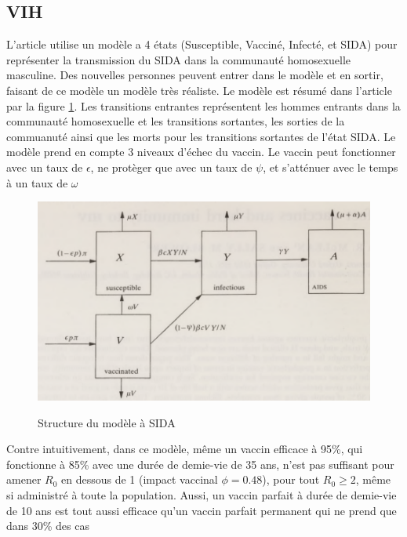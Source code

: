 \documentclass[journal, a4paper]{IEEEtran}
\begin{document}
	\subsection{VIH}
	L'article \cite{Imperfect_vaccines_and_herd_immunity_to_HIV_1993} utilise un modèle a 4 états (Susceptible, Vacciné, Infecté, et SIDA) pour représenter la transmission du SIDA dans la communauté homosexuelle masculine.
	Des nouvelles personnes peuvent entrer dans le modèle et en sortir, faisant de ce modèle un modèle très réaliste. Le modèle est résumé dans l'article par la figure \ref{fig:hiv_model}. Les transitions entrantes représentent les hommes entrants dans la communauté homosexuelle et les transitions sortantes, les sorties de la commuanuté ainsi que les morts pour les transitions sortantes de l'état SIDA. Le modèle prend en compte 3 niveaux d'échec du vaccin. Le vaccin peut fonctionner avec un taux de $\epsilon$, ne protèger que avec un taux de $\psi$, et s'atténuer avec le temps à un taux de $\omega$

	\begin{figure}[!hbt]
	 \caption{Structure du modèle à SIDA}
	 \includegraphics[width=\columnwidth]{Imperfect vaccines and herd immunity to hiv_model}
	 \label{fig:hiv_model}
	 \cite{Imperfect_vaccines_and_herd_immunity_to_HIV_1993}
	\end{figure}

	Contre intuitivement, dans ce modèle, même un vaccin efficace à 95\%, qui fonctionne à 85\% avec une durée de demie-vie de 35 ans, n'est pas suffisant pour amener $R_0$ en dessous de 1 (impact vaccinal $\phi = 0.48$), pour tout $R_0 \geq 2$, même si administré à toute la population. Aussi, un vaccin parfait à durée de demie-vie de 10 ans est tout aussi efficace qu'un vaccin parfait permanent qui ne prend que dans 30\% des cas
\end{document}
